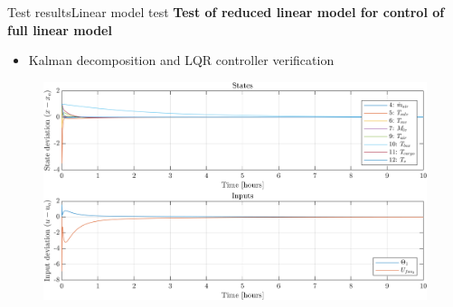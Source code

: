 \begin{frame}{Test results}{Linear model test}	 
	 \textbf{Test of reduced linear model for control of full linear model}
	 \begin{itemize}
	 	\item Kalman decomposition and LQR controller verification
	 \end{itemize}
 

 \begin{figure}[h!]
 	\centering
 	\includegraphics[width=1\textwidth]{../Graphics/fig_stateInput10h.png}

 	\label{fig:sim_stateInput10h}
 \end{figure}
 
\end{frame}




